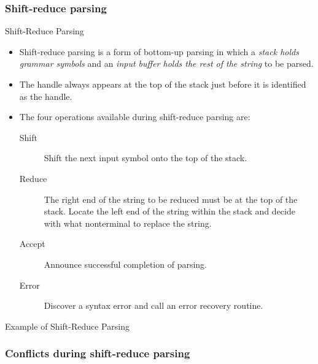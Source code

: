 \begin{bibunit}[apalike]
\subsubsection{Shift-reduce parsing}

\tableofcontentslide[sectionstyle={show/shaded},subsectionstyle={show/shaded/hide},subsubsectionstyle={show/shaded/hide/hide}]

\begin{frame}{Shift-Reduce Parsing}
	\begin{itemize}
	\item Shift-reduce parsing is a form of bottom-up parsing in which a \emph{stack holds grammar symbols} and an \emph{input buffer holds the rest of the string} to be parsed.
	\item The handle always appears at the top of the stack just before it is identified as the handle.
	\vfill
	\item The four operations available during shift-reduce parsing are:
		\begin{description}
		\item[Shift] Shift the next input symbol onto the top of the stack.
		\item[Reduce] The right end of the string to be reduced must be at the top of the stack. Locate the left end of the string within the stack and decide with what nonterminal to replace the string.
		\item[Accept] Announce successful completion of parsing.
		\item[Error] Discover a syntax error and call an error recovery routine.
		\end{description}
	\end{itemize}
\end{frame}

\begin{frame}{Example of Shift-Reduce Parsing}
	\begin{footnotesize}
	\end{footnotesize}
	\hfill
\end{frame}

\subsubsection{Conflicts during shift-reduce parsing}


\end{bibunit}
